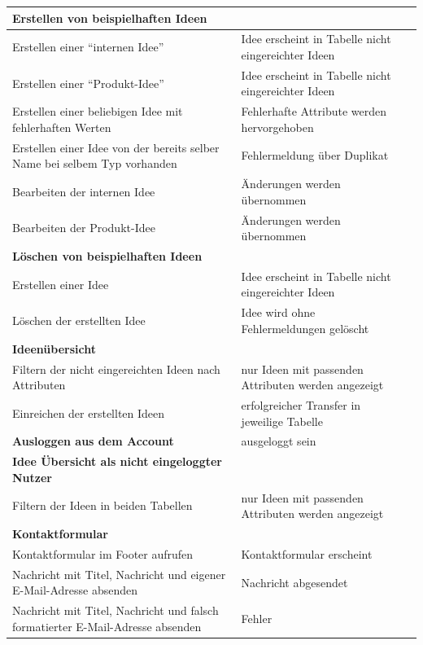 \begin{center}
\begin{longtable}{|p{}|p{}|p{}|}
        \textbf{Erstellen von beispielhaften Ideen} & &\\
        \hline
        Erstellen einer \enquote{internen Idee} & Idee erscheint in Tabelle nicht eingereichter Ideen &\\
        \hline
        Erstellen einer \enquote{Produkt-Idee} & Idee erscheint in Tabelle nicht eingereichter Ideen &\\
        \hline
        Erstellen einer beliebigen Idee mit fehlerhaften Werten & Fehlerhafte Attribute werden hervorgehoben &\\
        \hline
        Erstellen einer Idee von der bereits selber Name bei selbem Typ vorhanden & Fehlermeldung über Duplikat &\\
        \hline
        Bearbeiten der internen Idee & Änderungen werden übernommen &\\
        \hline
        Bearbeiten der Produkt-Idee & Änderungen werden übernommen &\\
        \hline
        \hline

        \textbf{Löschen von beispielhaften Ideen} & &\\
        \hline
        Erstellen einer Idee & Idee erscheint in Tabelle nicht eingereichter Ideen &\\
        \hline
        Löschen der erstellten Idee & Idee wird ohne Fehlermeldungen gelöscht &\\
        \hline
        \hline

        \textbf{Ideenübersicht} & &\\
        \hline
        Filtern der nicht eingereichten Ideen nach Attributen & nur Ideen mit passenden Attributen werden angezeigt &\\
        \hline
        Einreichen der erstellten Ideen & erfolgreicher Transfer in jeweilige Tabelle &\\
        \hline
        \hline

        \textbf{Ausloggen aus dem Account} & ausgeloggt sein &\\
        \hline
        \hline

        \textbf{Idee Übersicht als nicht eingeloggter Nutzer} & &\\
        \hline
        Filtern der Ideen in beiden Tabellen & nur Ideen mit passenden Attributen werden angezeigt &\\
        \hline
        \hline

        \textbf{Kontaktformular} & & \\
        \hline
        Kontaktformular im Footer aufrufen & Kontaktformular erscheint & \\
        \hline
        Nachricht mit Titel, Nachricht und eigener E-Mail-Adresse absenden & Nachricht abgesendet & \\
        \hline
        Nachricht mit Titel, Nachricht und falsch formatierter E-Mail-Adresse absenden & Fehler & \\
        \hline
        \hline


\end{longtable}
\end{center}
